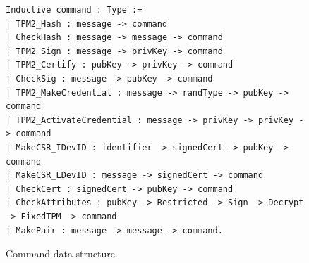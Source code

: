 \documentclass[runningheads]{llncs}
\begin{document}


\begin{figure}[hbtp]
  \begin{footnotesize}
\begin{lstlisting}[language=Coq]
Inductive command : Type :=
| TPM2_Hash : message -> command
| CheckHash : message -> message -> command
| TPM2_Sign : message -> privKey -> command
| TPM2_Certify : pubKey -> privKey -> command
| CheckSig : message -> pubKey -> command
| TPM2_MakeCredential : message -> randType -> pubKey -> command
| TPM2_ActivateCredential : message -> privKey -> privKey -> command
| MakeCSR_IDevID : identifier -> signedCert -> pubKey -> command
| MakeCSR_LDevID : message -> signedCert -> command
| CheckCert : signedCert -> pubKey -> command
| CheckAttributes : pubKey -> Restricted -> Sign -> Decrypt -> FixedTPM -> command
| MakePair : message -> message -> command.
\end{lstlisting}
\end{footnotesize}
\caption{Command data structure.}
\label{fig:command-model}
\end{figure}

\end{document}
